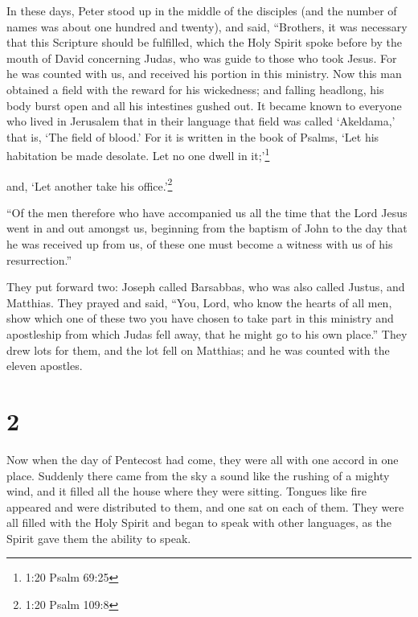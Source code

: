  In these days, Peter stood up in the middle of the
disciples (and the number of names was about one hundred and twenty),
and said,  ``Brothers, it was necessary that this Scripture
should be fulfilled, which the Holy Spirit spoke before by the mouth of
David concerning Judas, who was guide to those who took Jesus.
 For he was counted with us, and received his portion in
this ministry.  Now this man obtained a field with the
reward for his wickedness; and falling headlong, his body burst open and
all his intestines gushed out.  It became known to everyone
who lived in Jerusalem that in their language that field was called
`Akeldama,' that is, `The field of blood.'  For it is
written in the book of Psalms, `Let his habitation be made desolate. Let
no one dwell in it;'\footnote{1:20 Psalm 69:25}

and, `Let another take his office.'\footnote{1:20 Psalm 109:8}

 ``Of the men therefore who have accompanied us all the
time that the Lord Jesus went in and out amongst us, 
beginning from the baptism of John to the day that he was received up
from us, of these one must become a witness with us of his
resurrection.''

 They put forward two: Joseph called Barsabbas, who was
also called Justus, and Matthias.  They prayed and said,
``You, Lord, who know the hearts of all men, show which one of these two
you have chosen  to take part in this ministry and
apostleship from which Judas fell away, that he might go to his own
place.''  They drew lots for them, and the lot fell on
Matthias; and he was counted with the eleven apostles.

\hypertarget{section-1}{%
\section{2}\label{section-1}}

 Now when the day of Pentecost had come, they were all with
one accord in one place.  Suddenly there came from the sky a
sound like the rushing of a mighty wind, and it filled all the house
where they were sitting.  Tongues like fire appeared and
were distributed to them, and one sat on each of them.  They
were all filled with the Holy Spirit and began to speak with other
languages, as the Spirit gave them the ability to speak.

